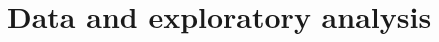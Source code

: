 \documentclass[11pt,a4paper]{article}
\begin{document}
\section{Data and exploratory analysis}

\clearpage


\end{document}
